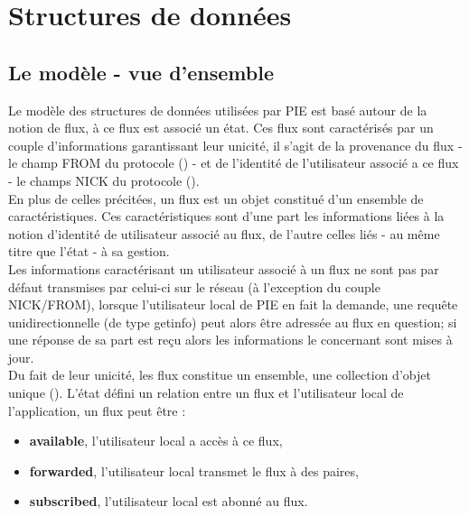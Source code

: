 

\section{Structures de données}
\label{section:storage}

\subsection{Le modèle - vue d'ensemble}

Le modèle des structures de données utilisées par PIE est basé autour de la notion de
flux, à ce flux est associé un état. Ces flux sont caractérisés par un couple d'informations
garantissant leur unicité, il s'agit de la provenance du flux - le champ FROM du protocole
() - et de l'identité de l'utilisateur associé a ce flux - le champs NICK
du protocole ().\\

En plus de celles précitées, un flux est un objet constitué d'un ensemble de caractéristiques.
Ces caractéristiques sont d'une part les informations liées à la notion d'identité de utilisateur
associé au flux, de l'autre celles liés - au même titre que l'état - à sa gestion. \\

Les informations caractérisant un utilisateur associé à un flux ne sont pas par défaut
transmises par celui-ci sur le réseau (à l'exception du couple NICK/FROM), lorsque 
l'utilisateur local de PIE en fait la demande, une requête unidirectionnelle (de type getinfo)
peut alors être adressée au flux en question; si une réponse de sa part est reçu alors
les informations le concernant sont mises à jour. \\

Du fait de leur unicité, les flux constitue un ensemble, une collection d'objet unique ().
L'état défini un relation entre un flux et l'utilisateur local de l'application, un flux
peut être : \\

\begin{itemize}
	\item \textbf{available}, l'utilisateur local a accès à ce flux,
    \item \textbf{forwarded}, l'utilisateur local transmet le flux à des paires,
    \item \textbf{subscribed}, l'utilisateur local est abonné au flux. \\
\end{itemize}

